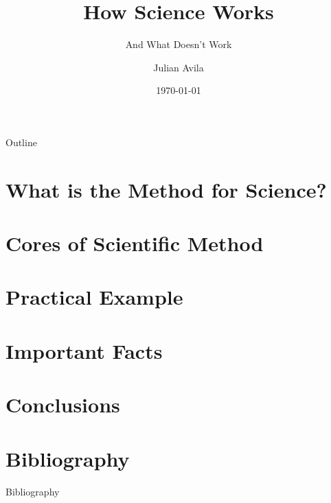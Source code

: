 \documentclass[pdflatex, sn-mathphys-num]{beamer}
\title{How Science Works}
\subtitle{And What Doesn't Work}
\author{Julian Avila}
\institute{Universidad Distrital Francisco José de Caldas}
\date{\today}
\begin{document}
\begin{frame}
	\titlepage
\end{frame}

\begin{frame}{Outline}
	\tableofcontents
\end{frame}

\section{What is the Method for Science?}


\section{Cores of Scientific Method}


\section{Practical Example}


\section{Important Facts}


\section{Conclusions}


\section{Bibliography}
\begin{frame}[allowframebreaks]{Bibliography}
	\printbibliography
\end{frame}
\end{document}
